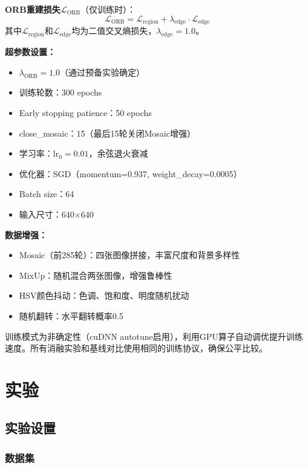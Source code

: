 \documentclass[journal]{IEEEtran}
\begin{document}
\textbf{ORB重建损失}$\mathcal{L}_{\text{ORB}}$（仅训练时）：
\begin{equation}
\mathcal{L}_{\text{ORB}} = \mathcal{L}_{\text{region}} + \lambda_{\text{edge}} \cdot \mathcal{L}_{\text{edge}}
\end{equation}
其中$\mathcal{L}_{\text{region}}$和$\mathcal{L}_{\text{edge}}$均为二值交叉熵损失，$\lambda_{\text{edge}}=1.0$。

\textbf{超参数设置：}
\begin{itemize}
    \item $\lambda_{\text{ORB}} = 1.0$（通过预备实验确定）
    \item 训练轮数：300 epochs
    \item Early stopping patience：50 epochs
    \item close\_mosaic：15（最后15轮关闭Mosaic增强）
    \item 学习率：$\text{lr}_0=0.01$，余弦退火衰减
    \item 优化器：SGD（momentum=0.937, weight\_decay=0.0005）
    \item Batch size：64
    \item 输入尺寸：640$\times$640
\end{itemize}

\textbf{数据增强：}
\begin{itemize}
    \item Mosaic（前285轮）：四张图像拼接，丰富尺度和背景多样性
    \item MixUp：随机混合两张图像，增强鲁棒性
    \item HSV颜色抖动：色调、饱和度、明度随机扰动
    \item 随机翻转：水平翻转概率0.5
\end{itemize}

训练模式为非确定性（cuDNN autotune启用），利用GPU算子自动调优提升训练速度。所有消融实验和基线对比使用相同的训练协议，确保公平比较。


\section{实验}
\label{sec:experiments}

\subsection{实验设置}
\label{subsec:experimental_setup}

\subsubsection{数据集}
\end{document}
